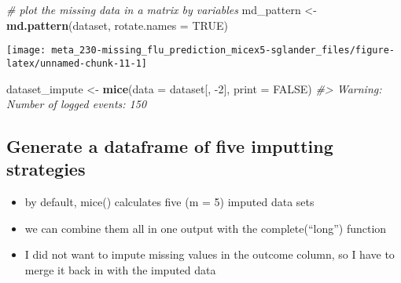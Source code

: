 \documentclass[]{book}
\newenvironment{Shaded}{\begin{snugshade}}{\end{snugshade}}
\newcommand{\CommentTok}[1]{\textcolor[rgb]{0.56,0.35,0.01}{\textit{#1}}}
\newcommand{\DataTypeTok}[1]{\textcolor[rgb]{0.13,0.29,0.53}{#1}}
\newcommand{\DecValTok}[1]{\textcolor[rgb]{0.00,0.00,0.81}{#1}}
\newcommand{\KeywordTok}[1]{\textcolor[rgb]{0.13,0.29,0.53}{\textbf{#1}}}
\newcommand{\NormalTok}[1]{#1}
\newcommand{\OtherTok}[1]{\textcolor[rgb]{0.56,0.35,0.01}{#1}}
\newcommand{\StringTok}[1]{\textcolor[rgb]{0.31,0.60,0.02}{#1}}
\providecommand{\tightlist}{%
  \setlength{\itemsep}{0pt}\setlength{\parskip}{0pt}}
\begin{document}
\begin{Shaded}
\begin{Highlighting}[]
\CommentTok{# plot the missing data in a matrix by variables}
\NormalTok{md_pattern <-}\StringTok{ }\KeywordTok{md.pattern}\NormalTok{(dataset, }\DataTypeTok{rotate.names =} \OtherTok{TRUE}\NormalTok{)}
\end{Highlighting}
\end{Shaded}

\begin{center}\texttt{[image: meta\_230-missing\_flu\_prediction\_micex5-sglander\_files/figure-latex/unnamed-chunk-11-1]} \end{center}

\begin{Shaded}
\begin{Highlighting}[]
\NormalTok{dataset_impute <-}\StringTok{ }\KeywordTok{mice}\NormalTok{(}\DataTypeTok{data =}\NormalTok{ dataset[, }\DecValTok{-2}\NormalTok{],  }\DataTypeTok{print =} \OtherTok{FALSE}\NormalTok{)}
\CommentTok{#> Warning: Number of logged events: 150}
\end{Highlighting}
\end{Shaded}

\hypertarget{generate-a-dataframe-of-five-imputting-strategies}{%
\subsection{Generate a dataframe of five imputting strategies}\label{generate-a-dataframe-of-five-imputting-strategies}}

\begin{itemize}
\tightlist
\item
  by default, mice() calculates five (m = 5) imputed data sets
\item
  we can combine them all in one output with the complete(``long'') function
\item
  I did not want to impute missing values in the outcome column, so I have to merge it back in with the imputed data
\end{itemize}
\end{document}
